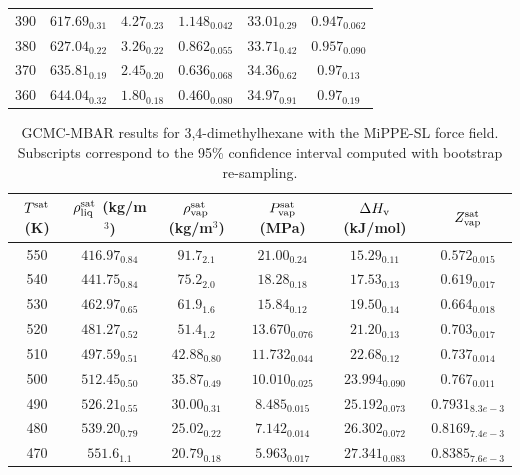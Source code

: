 \documentclass[journal=jctc,manuscript=article]{achemso}
\begin{document}
\begin{table}[htb!]
\begin{center}
\begin{tabular}{|c|c|c|c|c|c|}
			390 & $617.69_{0.31}$ & $4.27_{0.23}$ & $1.148_{0.042}$ & $33.01_{0.29}$ & $0.947_{0.062}$ \\
			380 & $627.04_{0.22}$ & $3.26_{0.22}$ & $0.862_{0.055}$ & $33.71_{0.42}$ & $0.957_{0.090}$ \\
			370 & $635.81_{0.19}$ & $2.45_{0.20}$ & $0.636_{0.068}$ & $34.36_{0.62}$ & $0.97_{0.13}$ \\
			360 & $644.04_{0.32}$ & $1.80_{0.18}$ & $0.460_{0.080}$ & $34.97_{0.91}$ & $0.97_{0.19}$ \\
			\hline
		\end{tabular}
	\end{center}
\end{table}

\begin{table}[htb!]
	\caption{GCMC-MBAR results for 3,4-dimethylhexane with the MiPPE-SL force field. Subscripts correspond to the 95\% confidence interval computed with bootstrap re-sampling.}
	\begin{center}
		\begin{tabular}{|c|c|c|c|c|c|}
			\hline
			$T^{\rm sat}$ (K) & $\rho_{\rm liq}^{\rm sat}$ (kg/m$^3$) & $\rho_{\rm vap}^{\rm sat}$ (kg/m$^3$) & $P_{\rm vap}^{\rm sat}$ (MPa) & $\Delta H_{\rm v}$ (kJ/mol) & $Z_{\rm vap}^{\rm sat}$ \\ \hline
			550 & $416.97_{0.84}$ & $91.7_{2.1}$ & $21.00_{0.24}$ & $15.29_{0.11}$ & $0.572_{0.015}$ \\
			540 & $441.75_{0.84}$ & $75.2_{2.0}$ & $18.28_{0.18}$ & $17.53_{0.13}$ & $0.619_{0.017}$ \\
			530 & $462.97_{0.65}$ & $61.9_{1.6}$ & $15.84_{0.12}$ & $19.50_{0.14}$ & $0.664_{0.018}$ \\
			520 & $481.27_{0.52}$ & $51.4_{1.2}$ & $13.670_{0.076}$ & $21.20_{0.13}$ & $0.703_{0.017}$ \\
			510 & $497.59_{0.51}$ & $42.88_{0.80}$ & $11.732_{0.044}$ & $22.68_{0.12}$ & $0.737_{0.014}$ \\
			500 & $512.45_{0.50}$ & $35.87_{0.49}$ & $10.010_{0.025}$ & $23.994_{0.090}$ & $0.767_{0.011}$ \\
			490 & $526.21_{0.55}$ & $30.00_{0.31}$ & $8.485_{0.015}$ & $25.192_{0.073}$ & $0.7931_{8.3e-3}$ \\
			480 & $539.20_{0.79}$ & $25.02_{0.22}$ & $7.142_{0.014}$ & $26.302_{0.072}$ & $0.8169_{7.4e-3}$ \\
			470 & $551.6_{1.1}$ & $20.79_{0.18}$ & $5.963_{0.017}$ & $27.341_{0.083}$ & $0.8385_{7.6e-3}$ \\

\end{tabular}
\end{center}
\end{table}
\end{document}
